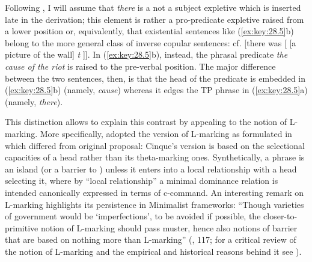 \documentclass[output=paper]{langsci/langscibook}
\begin{document}
\ea%
    \label{ex:key:28.5}
	\z
\z

Following \textcite{Moro1988,Moro1997}, I will assume that \emph{there} is a
not a subject expletive which is inserted late in the derivation; this element
is rather a pro-predicate expletive raised from a lower position or,
equivalently, that existential sentences like (\ref{ex:key:28.5}b) belong to the
more general class of inverse copular sentences: cf. [there was [ [a picture of
the wall] \emph{t} ]]. In (\ref{ex:key:28.5}b), instead, the phrasal predicate
\emph{the cause of the riot} is raised to the pre-verbal position. The major
difference between the two sentences, then, is that the head of the predicate
is embedded in (\ref{ex:key:28.5}b) (namely, \emph{cause}) whereas it edges the TP
phrase in (\ref{ex:key:28.5}a) (namely, \emph{there}).

This distinction allows to explain this contrast by appealing to the notion of
L-marking. More specifically, \citet{Moro1997} adopted the version of L-marking
as formulated in \citet{Cinque1990} which differed from 
original proposal: Cinque's version is based on the selectional capacities of a
head rather than its theta-marking ones. Synthetically, a phrase is an
island
(or a barrier to ) unless it enters into a local relationship with a
head selecting it, where by “local relationship” a minimal dominance relation
is intended canonically expressed in terms of c-command. An interesting remark
on L-marking highlights its persistence in Minimalist frameworks: “Though
varieties of government would be `imperfections', to be avoided if possible,
the closer-to-primitive notion of L-marking should pass muster, hence also
notions of barrier that are based on nothing more than L-marking”
(\citealt{Chomsky2000}, 117; for a critical review of the notion of L-marking
and the empirical and historical reasons behind it see \citealt{Roberts1988}).\largerpage[2]
\end{document}
